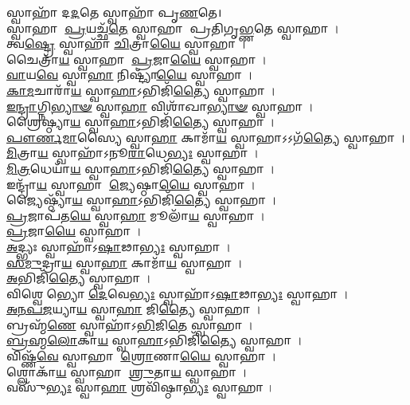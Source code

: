 𑌸𑍍𑌵𑌾𑌹𑌾᳴ 𑌦\-\ul{𑌦}\-𑌤𑍇 𑌸𑍍𑌵𑌾𑌹𑌾᳴ 𑌪𑍃\-\ul{𑌣}\-𑌤𑍇।\\
𑌸𑍍𑌵𑌾𑌹𑌾 \ul{𑌪𑍍𑌰}\-𑌯𑌚𑍍𑌛᳴\-\ul{𑌤𑍇} 𑌸𑍍𑌵𑌾𑌹𑌾 𑌪𑍍𑌰𑌤𑌿𑌗𑍃\-\ul{𑌭𑍍𑌣}\-𑌤𑍇 𑌸𑍍𑌵𑌾𑌹𑌾।\\
𑌤𑍍𑌵\-\ul{𑌷𑍍𑌟𑍍𑌰𑍇} 𑌸𑍍𑌵𑌾𑌹𑌾᳴ \ul{𑌚𑌿}\-𑌤𑍍𑌰𑌾\-\ul{𑌯𑍈} 𑌸𑍍𑌵𑌾𑌹𑌾।\\
𑌚𑍈𑌤𑍍𑌰𑌾᳴\-\ul{𑌯} 𑌸𑍍𑌵𑌾𑌹𑌾 \ul{𑌪𑍍𑌰}\-𑌜𑌾\-\ul{𑌯𑍈} 𑌸𑍍𑌵𑌾𑌹𑌾।\\
\-\ul{𑌵𑌾}\-𑌯\-\ul{𑌵𑍇} 𑌸𑍍𑌵𑌾\-\ul{𑌹𑌾} 𑌨𑌿𑌷𑍍𑌟𑍍𑌯𑌾᳴\-\ul{𑌯𑍈} 𑌸𑍍𑌵𑌾𑌹𑌾।\\
\-\ul{𑌕𑌾}\-\-\ul{𑌮}\-𑌚𑌾𑌰𑌾᳴\-\ul{𑌯} 𑌸𑍍𑌵𑌾\-\ul{𑌹𑌾}\-𑌽𑌭𑌿𑌜𑌿᳴\-\ul{𑌤𑍍𑌯𑍈} 𑌸𑍍𑌵𑌾𑌹𑌾।\\
\-\ul{𑌇}\-\-\ul{𑌨𑍍𑌦𑍍𑌰𑌾}\-𑌗𑍍𑌨𑌿\-\ul{𑌭𑍍𑌯𑌾}\-\-\ul{𑍟} 𑌸𑍍𑌵𑌾\-\ul{𑌹𑌾} 𑌵𑌿𑌶𑌾᳴𑌖𑌾\-\ul{𑌭𑍍𑌯𑌾}\-\-\ul{𑍟} 𑌸𑍍𑌵𑌾𑌹𑌾।\\
𑌶𑍍𑌰𑍈𑌷𑍍𑌠𑍍𑌯𑌾\-\ul{𑌯} 𑌸𑍍𑌵𑌾\-\ul{𑌹𑌾}\-𑌽𑌭𑌿𑌜𑌿᳴\-\ul{𑌤𑍍𑌯𑍈} 𑌸𑍍𑌵𑌾𑌹𑌾।\\
\-\ul{𑌪𑍗}\-\-\ul{𑌰𑍍𑌣}\-\-\ul{𑌮𑌾}\-𑌸𑍍𑌯𑍈 𑌸𑍍𑌵𑌾\-\ul{𑌹𑌾} 𑌕𑌾𑌮𑌾᳴\-\ul{𑌯} 𑌸𑍍𑌵𑌾𑌹𑌾𑌽𑌽𑌗᳴\-\ul{𑌤𑍍𑌯𑍈} 𑌸𑍍𑌵𑌾𑌹𑌾।\\
\-\ul{𑌮𑌿}\-𑌤𑍍𑌰𑌾\-\ul{𑌯} 𑌸𑍍𑌵𑌾𑌹𑌾᳴𑌽𑌨𑍂\-\ul{𑌰𑌾}\-𑌧𑍇\-\ul{𑌭𑍍𑌯𑌃} 𑌸𑍍𑌵𑌾𑌹𑌾।\\
\-\ul{𑌮𑌿}\-\-\ul{𑌤𑍍𑌰}\-𑌧𑍇𑌯𑌾᳴\-\ul{𑌯} 𑌸𑍍𑌵𑌾\-\ul{𑌹𑌾}\-𑌽𑌭𑌿𑌜𑌿᳴\-\ul{𑌤𑍍𑌯𑍈} 𑌸𑍍𑌵𑌾𑌹𑌾।\\
𑌇𑌨𑍍𑌦𑍍𑌰𑌾᳴\-\ul{𑌯} 𑌸𑍍𑌵𑌾𑌹𑌾 \ul{𑌜𑍍𑌯𑍇}\-𑌷𑍍𑌠𑌾\-\ul{𑌯𑍈} 𑌸𑍍𑌵𑌾𑌹𑌾।\\
𑌜𑍍𑌯𑍈𑌷𑍍𑌠𑍍𑌯𑌾᳴\-\ul{𑌯} 𑌸𑍍𑌵𑌾\-\ul{𑌹𑌾}\-𑌽𑌭𑌿𑌜𑌿᳴\-\ul{𑌤𑍍𑌯𑍈} 𑌸𑍍𑌵𑌾𑌹𑌾।\\
\-\ul{𑌪𑍍𑌰}\-𑌜𑌾𑌪᳴𑌤\-\ul{𑌯𑍇} 𑌸𑍍𑌵𑌾\-\ul{𑌹𑌾} 𑌮𑍂𑌲𑌾᳴\-\ul{𑌯} 𑌸𑍍𑌵𑌾𑌹𑌾।\\
\-\ul{𑌪𑍍𑌰}\-𑌜𑌾\-\ul{𑌯𑍈} 𑌸𑍍𑌵𑌾𑌹𑌾।\\
\-\ul{𑌅}\-𑌦𑍍𑌭𑍍𑌯𑌃 𑌸𑍍𑌵𑌾𑌹𑌾᳴𑌽\-\ul{𑌷𑌾}\-𑌢𑌾\-\ul{𑌭𑍍𑌯𑌃} 𑌸𑍍𑌵𑌾𑌹𑌾।\\
\-\ul{𑌸}\-\-\ul{𑌮𑍁}\-𑌦𑍍𑌰𑌾\-\ul{𑌯} 𑌸𑍍𑌵𑌾\-\ul{𑌹𑌾} 𑌕𑌾𑌮𑌾᳴\-\ul{𑌯} 𑌸𑍍𑌵𑌾𑌹𑌾।\\
\-\ul{𑌅}\-𑌭𑌿𑌜𑌿᳴\-\ul{𑌤𑍍𑌯𑍈} 𑌸𑍍𑌵𑌾𑌹𑌾।\\
𑌵𑌿𑌶𑍍𑌵𑍇𑌭𑍍𑌯𑍋 \ul{𑌦𑍇}\-𑌵𑍇\-\ul{𑌭𑍍𑌯𑌃} 𑌸𑍍𑌵𑌾𑌹𑌾᳴𑌽\-\ul{𑌷𑌾}\-𑌢𑌾\-\ul{𑌭𑍍𑌯𑌃} 𑌸𑍍𑌵𑌾𑌹𑌾।\\
\-\ul{𑌅}\-\-\ul{𑌨}\-\-\ul{𑌪}\-\-\ul{𑌜}\-𑌯𑍍𑌯𑌾\-\ul{𑌯} 𑌸𑍍𑌵𑌾\-\ul{𑌹𑌾} 𑌜𑌿\-\ul{𑌤𑍍𑌯𑍈} 𑌸𑍍𑌵𑌾𑌹𑌾।\\
𑌬𑍍𑌰𑌹𑍍𑌮᳴\-\ul{𑌣𑍇} 𑌸𑍍𑌵𑌾𑌹𑌾᳴𑌽\-\ul{𑌭𑌿}\-𑌜𑌿\-\ul{𑌤𑍇} 𑌸𑍍𑌵𑌾𑌹𑌾।\\
\-\ul{𑌬𑍍𑌰}\-\-\ul{𑌹𑍍𑌮}\-\-\ul{𑌲𑍋}\-𑌕𑌾\-\ul{𑌯} 𑌸𑍍𑌵𑌾\-\ul{𑌹𑌾}\-𑌽𑌭𑌿𑌜𑌿᳴\-\ul{𑌤𑍍𑌯𑍈} 𑌸𑍍𑌵𑌾𑌹𑌾।\\
𑌵𑌿𑌷𑍍𑌣᳴\-\ul{𑌵𑍇} 𑌸𑍍𑌵𑌾𑌹𑌾 \ul{𑌶𑍍𑌰𑍋}\-𑌣𑌾\-\ul{𑌯𑍈} 𑌸𑍍𑌵𑌾𑌹𑌾।\\
𑌶𑍍𑌲𑍋𑌕𑌾᳴\-\ul{𑌯} 𑌸𑍍𑌵𑌾𑌹𑌾 \ul{𑌶𑍍𑌰𑍁}\-𑌤𑌾\-\ul{𑌯} 𑌸𑍍𑌵𑌾𑌹𑌾।\\
𑌵𑌸𑍁᳴\-\ul{𑌭𑍍𑌯𑌃} 𑌸𑍍𑌵𑌾\-\ul{𑌹𑌾} 𑌶𑍍𑌰𑌵𑌿᳴𑌷𑍍𑌠𑌾\-\ul{𑌭𑍍𑌯𑌃} 𑌸𑍍𑌵𑌾𑌹𑌾।\\
